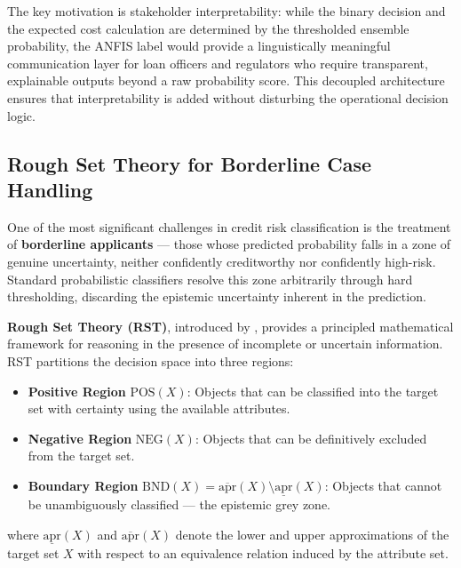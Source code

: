 \documentclass[12pt,a4paper]{article}
\begin{document}
The key motivation is stakeholder interpretability: while the binary decision and the expected cost calculation are determined by the thresholded ensemble probability, the ANFIS label would provide a linguistically meaningful communication layer for loan officers and regulators who require transparent, explainable outputs beyond a raw probability score. This decoupled architecture ensures that interpretability is added without disturbing the operational decision logic.

\subsection{Rough Set Theory for Borderline Case Handling}

One of the most significant challenges in credit risk classification is the treatment of \textbf{borderline applicants} — those whose predicted probability falls in a zone of genuine uncertainty, neither confidently creditworthy nor confidently high-risk. Standard probabilistic classifiers resolve this zone arbitrarily through hard thresholding, discarding the epistemic uncertainty inherent in the prediction.

\textbf{Rough Set Theory (RST)}, introduced by \citet{pawlak1982rough}, provides a principled mathematical framework for reasoning in the presence of incomplete or uncertain information. RST partitions the decision space into three regions:

\begin{itemize}
    \item \textbf{Positive Region} $\text{POS}(X)$: Objects that can be classified into the target set with certainty using the available attributes.
    \item \textbf{Negative Region} $\text{NEG}(X)$: Objects that can be definitively excluded from the target set.
    \item \textbf{Boundary Region} $\text{BND}(X) = \overline{\text{apr}}(X) \setminus \underline{\text{apr}}(X)$: Objects that cannot be unambiguously classified — the epistemic grey zone.
\end{itemize}

where $\underline{\text{apr}}(X)$ and $\overline{\text{apr}}(X)$ denote the lower and upper approximations of the target set $X$ with respect to an equivalence relation induced by the attribute set.
\end{document}
